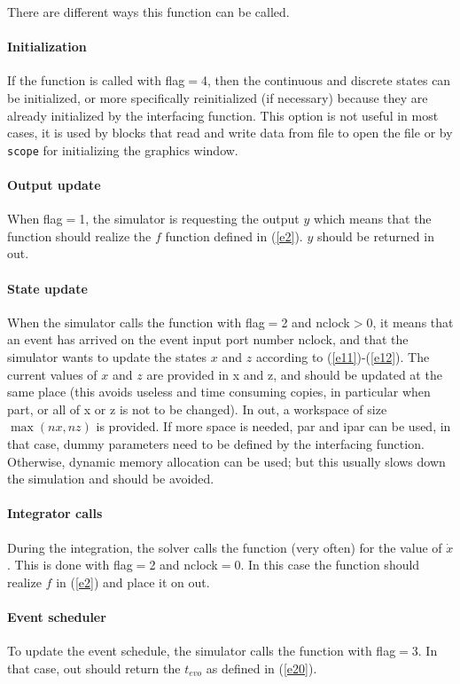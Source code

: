 There are different ways this function can be called.

\paragraph{Initialization} If the function is called with flag$=$4, then
the continuous and discrete states can be initialized, or more
specifically reinitialized (if necessary) because they are already
initialized by the interfacing function. This option is not useful in
most cases, it is used by blocks that read and write data from file to open the
file or by {\tt scope} for initializing the graphics window.

\paragraph{Output update} When flag$=$1, the simulator is requesting the
output $y$ which means that the function should realize the $f$
function defined in (\ref{e2}). $y$ should be returned in out.

\paragraph{State update} When the simulator calls the function with
flag$=$2 and nclock$>0$, it means that an event has arrived on the event
input port number nclock, and that the simulator wants to update the
states $x$ and $z$ according to (\ref{e11})-(\ref{e12}). The current
values of $x$ and $z$ are provided in 
x and z, and should be updated at the same place (this avoids useless
and time consuming copies, in particular when part, or all of x or z
is not to be changed). In out, a workspace of size $\max(nx,nz)$ is
provided. If more space is needed, par and ipar can be
used, in that case, dummy parameters need to be defined by the
interfacing function. Otherwise, dynamic memory allocation can be
used; but this usually slows down the simulation and should be avoided.

\paragraph{Integrator calls} During the integration, the solver calls
the function (very often) for the value of $\dot{x}$. This is done
with flag$=$2 and nclock$=$0. In this case the function should realize $f$
in (\ref{e2}) and place it on out.

\paragraph{Event scheduler} To update the event schedule, the
simulator calls the function with flag$=$3. In that case, out should
return the $t_{evo}$ as defined in (\ref{e20}).

